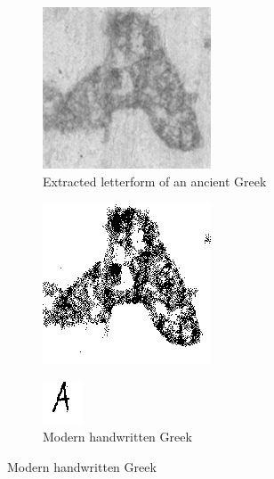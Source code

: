 \documentclass[10pt,twocolumn,letterpaper]{article}
\begin{document}
\begin{figure}
    \centering
    \begin{subfigure}{0.5\textwidth}
        \centering
        \includegraphics[width=0.4\linewidth]{res/198423984.png}
        \caption{Extracted letterform of an ancient Greek \textAlpha}
        \label{fig:regalpha}
    \end{subfigure}
    \begin{subfigure}{0.5\textwidth}
        \centering
        \includegraphics[width=0.4\linewidth]{res/001.png}
        \label{fig:binalpha}
    \end{subfigure}
    \begin{subfigure}{0.5\textwidth}
        \centering
        \includegraphics[width=0.4\linewidth]{res/form14.png}
        \caption{Modern handwritten Greek \textAlpha}
        \label{fig:binalpha}
    \end{subfigure}
\end{figure}
\end{document}
